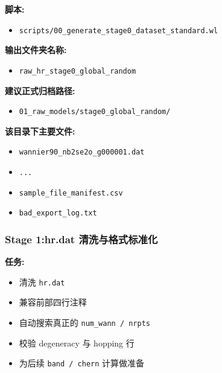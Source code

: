 \documentclass[lang=cn,scheme=chinese,color=blue,device=normal,toc=onecol,math=cm]{elegantbook}
\begin{document}
\textbf{脚本:}\par


\begin{itemize}
\item \texttt{scripts/\allowbreak{}00\_\allowbreak{}generate\_\allowbreak{}stage0\_\allowbreak{}dataset\_\allowbreak{}standard.wl}
\end{itemize}


\textbf{输出文件夹名称:}\par


\begin{itemize}
\item \texttt{raw\_\allowbreak{}hr\_\allowbreak{}stage0\_\allowbreak{}global\_\allowbreak{}random}
\end{itemize}


\textbf{建议正式归档路径:}\par


\begin{itemize}
\item \texttt{01\_\allowbreak{}raw\_\allowbreak{}models/\allowbreak{}stage0\_\allowbreak{}global\_\allowbreak{}random/\allowbreak{}}
\end{itemize}


\textbf{该目录下主要文件:}\par


\begin{itemize}
\item \texttt{wannier90\_\allowbreak{}nb2se2o\_\allowbreak{}g000001.dat}
\item \texttt{...}
\item \texttt{sample\_\allowbreak{}file\_\allowbreak{}manifest.csv}
\item \texttt{bad\_\allowbreak{}export\_\allowbreak{}log.txt}
\end{itemize}


\subsubsection{Stage 1:hr.dat 清洗与格式标准化}


\textbf{任务:}\par


\begin{itemize}
\item 清洗 \texttt{hr.dat}
\item 兼容前部四行注释
\item 自动搜索真正的 \texttt{num\_\allowbreak{}wann /\allowbreak{} nrpts}
\item 校验 degeneracy 与 hopping 行
\item 为后续 \texttt{band /\allowbreak{} chern} 计算做准备
\end{itemize}
\end{document}
